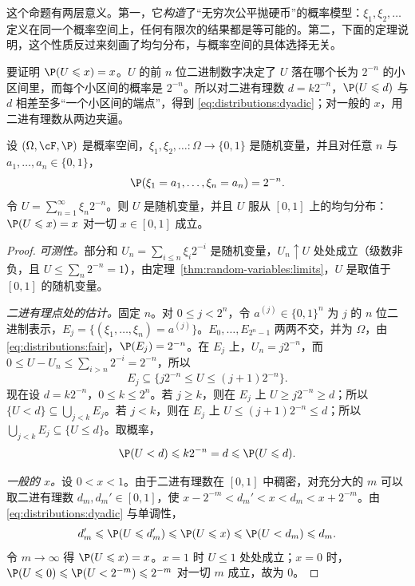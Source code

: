 这个命题有两层意义。第一，它\emph{构造}了“无穷次公平抛硬币”的概率模型：$\xi_1,\xi_2,\dots$ 定义在同一个概率空间上，任何有限次的结果都是等可能的。第二，下面的定理说明，这个性质反过来刻画了均匀分布，与概率空间的具体选择无关。

\begin{remark}[证明思路]
要证明 $\P(U\leqslant x)=x$。$U$ 的前 $n$ 位二进制数字决定了 $U$ 落在哪个长为 $2^{-n}$ 的小区间里，而每个小区间的概率是 $2^{-n}$。所以对二进有理数 $d=k2^{-n}$，$\P(U\leqslant d)$ 与 $d$ 相差至多“一个小区间的端点”，得到 \eqref{eq:distributions:dyadic}；对一般的 $x$，用二进有理数从两边夹逼。
\end{remark}

\begin{theorem}[公平硬币给出均匀分布]\label{thm:distributions:coins-to-uniform}
设 $(\Omega,\cF,\P)$ 是概率空间，$\xi_1,\xi_2,\dots:\Omega\to\{0,1\}$ 是随机变量，并且对任意 $n$ 与 $a_1,\dots,a_n\in\{0,1\}$，
\begin{equation}\label{eq:distributions:fair}
\P(\xi_1=a_1,\dots,\xi_n=a_n)=2^{-n}.
\end{equation}
令 $U=\sum_{n=1}^\infty\xi_n2^{-n}$。则 $U$ 是随机变量，并且 $U$ 服从 $[0,1]$ 上的均匀分布：$\P(U\leqslant x)=x$ 对一切 $x\in[0,1]$ 成立。
\end{theorem}
\begin{proof}
\emph{可测性。}部分和 $U_n=\sum_{i\leqslant n}\xi_i2^{-i}$ 是随机变量，$U_n\uparrow U$ 处处成立（级数非负，且 $U\leqslant\sum_n2^{-n}=1$），由定理~\ref{thm:random-variables:limits}，$U$ 是取值于 $[0,1]$ 的随机变量。

\emph{二进有理点处的估计。}固定 $n$。对 $0\leqslant j<2^n$，令 $a^{(j)}\in\{0,1\}^n$ 为 $j$ 的 $n$ 位二进制表示，$E_j=\{(\xi_1,\dots,\xi_n)=a^{(j)}\}$。$E_0,\dots,E_{2^n-1}$ 两两不交，并为 $\Omega$，由 \eqref{eq:distributions:fair}，$\P(E_j)=2^{-n}$。在 $E_j$ 上，$U_n=j2^{-n}$，而 $0\leqslant U-U_n\leqslant\sum_{i>n}2^{-i}=2^{-n}$，所以
\[
E_j\subseteq\{j2^{-n}\leqslant U\leqslant(j+1)2^{-n}\}.
\]
现在设 $d=k2^{-n}$，$0\leqslant k\leqslant2^n$。若 $j\geqslant k$，则在 $E_j$ 上 $U\geqslant j2^{-n}\geqslant d$；所以 $\{U<d\}\subseteq\bigcup_{j<k}E_j$。若 $j<k$，则在 $E_j$ 上 $U\leqslant(j+1)2^{-n}\leqslant d$；所以 $\bigcup_{j<k}E_j\subseteq\{U\leqslant d\}$。取概率，
\begin{equation}\label{eq:distributions:dyadic}
\P(U<d)\leqslant k2^{-n}=d\leqslant \P(U\leqslant d).
\end{equation}

\emph{一般的 $x$。}设 $0<x<1$。由于二进有理数在 $[0,1]$ 中稠密，对充分大的 $m$ 可以取二进有理数 $d_m,d_m'\in[0,1]$，使 $x-2^{-m}<d_m'<x<d_m<x+2^{-m}$。由 \eqref{eq:distributions:dyadic} 与单调性，
\[
d_m'\leqslant \P(U\leqslant d_m')\leqslant \P(U\leqslant x)\leqslant \P(U<d_m)\leqslant d_m.
\]
令 $m\to\infty$ 得 $\P(U\leqslant x)=x$。$x=1$ 时 $U\leqslant1$ 处处成立；$x=0$ 时，$\P(U\leqslant0)\leqslant \P(U<2^{-m})\leqslant2^{-m}$ 对一切 $m$ 成立，故为 $0$。
\end{proof}

